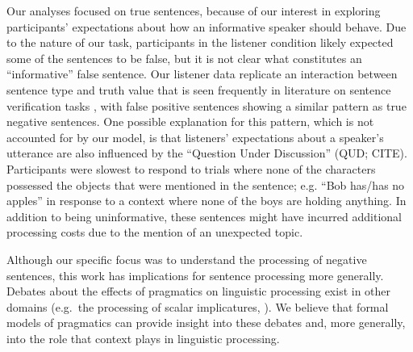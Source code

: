 \documentclass[man]{apa2}
\begin{document}
Our analyses focused on true sentences, because of our interest in exploring participants' expectations about how an informative speaker should behave.  Due to the nature of our task, participants in the listener condition likely expected some of the sentences to be false, but it is not clear what constitutes an ``informative'' false sentence.  Our listener data replicate an interaction between sentence type and truth value that is seen frequently in literature on sentence verification tasks \cite{hclark1972}, with false positive sentences showing a similar pattern as true negative sentences.  One possible explanation for this pattern, which is not accounted for by our model, is that listeners' expectations about a speaker's utterance are also influenced by the ``Question Under Discussion'' (QUD; CITE). Participants were slowest to respond to trials where none of the characters possessed the objects that were mentioned in the sentence; e.g. ``Bob has/has no apples'' in response to a context where none of the boys are holding anything.  In addition to being uninformative, these sentences might have incurred additional processing costs due to the mention of an unexpected topic.  

Although our specific focus was to understand the processing of negative sentences, this work has implications for sentence processing more generally.  Debates about the effects of pragmatics on linguistic processing exist in other domains (e.g.\ the processing of scalar implicatures, ). We believe that formal models of pragmatics can provide insight into these debates and, more generally, into the role that context plays in linguistic processing. 
 




\setlength{\bibleftmargin}{.125in}
\setlength{\bibindent}{-\bibleftmargin}


\end{document}
